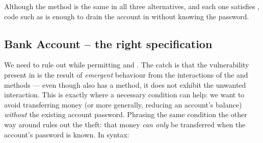 Although the  method is the same in
all three alternatives, and each one satisfies ,
code such as
%
%
is enough to drain the account in  without knowing the password.


 \subsection{Bank Account -- the right specification}
\label{s:bankSpecEx}

We need to rule out  while permitting  and
. The catch is that the vulnerability present in  is the result
of  \emph{emergent} behaviour from the interactions of the 
and  methods --- even though  also has a
 method, it does not exhibit the unwanted interaction.
This is exactly where a necessary condition can help:
we want to avoid transferring money
(or more generally, reducing an account's balance)
\textit{without} the existing account password.  Phrasing the same condition
the other way around %
rules out the theft: that money \textit{can only} be
transferred when the account's password is known.
In \Nec  syntax:

